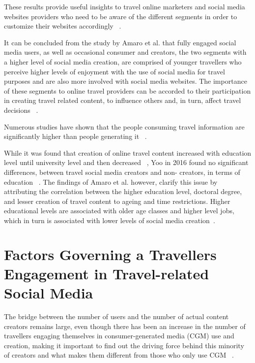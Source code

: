 These results provide useful insights to travel online marketers and social media websites providers who need to be aware of the different segments in order to customize their websites accordingly ~\cite{amaro2016travelers}.

It can be concluded from the study by Amaro et al. that fully engaged social media users, as well as occasional consumer and creators, the two segments with a higher level of social media creation, are comprised of younger travellers who perceive higher levels of enjoyment with the use of social media for travel purposes and are also more involved with social media websites. The importance of these segments to online travel providers can be accorded to their participation in creating travel related content, to influence others and, in turn, affect travel decisions ~\cite{amaro2016travelers}.

Numerous studies have shown that the people consuming travel information are significantly higher than people generating it ~\cite{pan2012theoretical, YOO2011609}.  

While it was found that creation of online travel content increased with education level until university level and then decreased  ~\cite{ip2012profiling}, Yoo in 2016 found no significant differences, between travel social media creators and non- creators, in terms of education ~\cite{yoo2016use}. The findings of Amaro et al. however, clarify this issue by attributing the correlation between the higher education level, doctoral degree, and lesser creation of travel content to ageing and time restrictions. Higher educational levels are associated with older age classes and higher level jobs, which in turn is associated with lower levels of social media creation~\cite{amaro2016travelers}. 

		


\section{Factors Governing a Traveller\textquotesingle s Engagement in Travel-related Social Media}\label{2}
The bridge between the number of users and the number of actual content creators remains large, even though there has been an increase in the number of travellers engaging themselves in consumer-generated media (CGM) use and creation, making it important to find out the driving force behind this minority of creators and what makes them different from those who only use CGM ~\cite{yoo2011influence}. 

